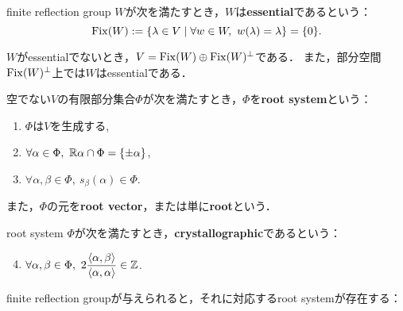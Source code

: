 \begin{defi}
  finite reflection group $W$が次を満たすとき，$W$は\textbf{essential}であるという：
  \begin{equation}
    \operatorname{Fix}(W) := \left\lbrace \lambda \in V \mathrel{} \middle| \mathrel{} \forall w \in W,\ w(\lambda) = \lambda \right\rbrace = \{0\}.
  \end{equation}
\end{defi}

\begin{rem}
  $W$がessentialでないとき，$V = \operatorname{Fix}(W) \oplus \operatorname{Fix}(W)^\perp$である．
  また，部分空間$\operatorname{Fix}(W)^\perp$上では$W$はessentialである．
\end{rem}

\begin{defi}
  空でない$V$の有限部分集合$\Phi$が次を満たすとき，$\Phi$を\textbf{root system}という：
  \begin{enumerate}[label=(\roman*)]
    \item $\Phi$は$V$を生成する, \label{defi:root_gen}
    \item $\forall \alpha \in \Phi,\ \mathbb{R} \alpha \cap \Phi = \{\pm \alpha\}$, \label{defi:root_self}
    \item $\forall \alpha, \beta \in \Phi,\ s_\beta(\alpha) \in \Phi$. \label{defi:root_ref_closed}
  \end{enumerate}
  また，$\Phi$の元を\textbf{root vector}，または単に\textbf{root}という．
\end{defi}

\begin{defi}
  root system $\Phi$が次を満たすとき，\textbf{crystallographic}であるという：
  \begin{enumerate}[label=(\roman*)]
    \setcounter{enumi}{3}
    \item $\forall \alpha, \beta \in \Phi,\ 2 \dfrac{\left\langle \alpha, \beta \right\rangle}{\left\langle \alpha, \alpha \right\rangle} \in \mathbb{Z}$.
  \end{enumerate}
\end{defi}

finite reflection groupが与えられると，それに対応するroot systemが存在する：


